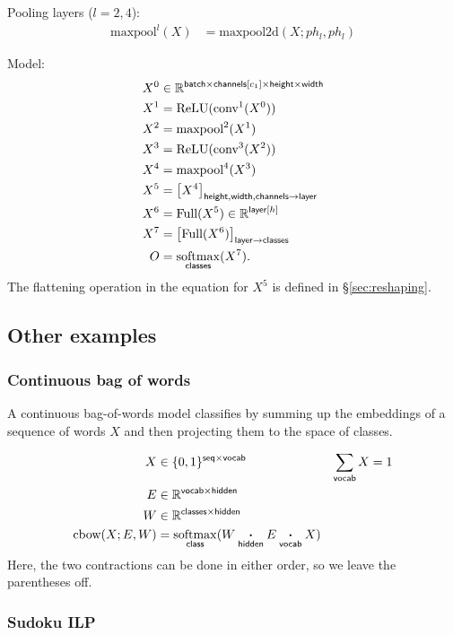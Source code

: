 \documentclass{article}
\newcommand{\reals}{\mathbb{R}}
\begin{document}
Pooling layers ($l = 2, 4$):
\begin{align*}
\text{maxpool}^l(X) &= \text{maxpool2d}(X; ph_l, ph_l)
\end{align*}

Model:
\begin{align*}
X^0 &\in \reals^{\name{batch} \times \nset{channels}{c_1} \times \name{height} \times \name{width}}\\
X^1 &= \text{ReLU}(\text{conv}^1(X^0)) \\
X^2 &= \text{maxpool}^2(X^1) \\
X^3 &= \text{ReLU}(\text{conv}^3(X^2)) \\
X^4 &= \text{maxpool}^4(X^3) \\
X^5 &= \nmov{height,width,channels}{layer}{X^4} \\
X^6 &= \text{Full}(X^5) \in \mathbb{R}^{\nset{layer}{h}} \\
X^7 &= \nmov{layer}{classes}{\text{Full}(X^6)} \\
O &= \nfun{classes}{softmax}(X^7).
\end{align*}
The flattening operation in the equation for $X^5$ is defined in \S{\ref{sec:reshaping}}.

\subsection{Other examples}

\subsubsection{Continuous bag of words}

A continuous bag-of-words model classifies by summing up the embeddings of a sequence of words $X$ and then projecting them to the space of classes. 

\begin{align*}
X &\in \{0, 1\}^{{\name{seq} \times \name{vocab}}} & \nsum{vocab} X &= 1\\
E &\in \reals^{{\name{vocab} \times \name{hidden}}}\\
W &\in \reals^{{\name{classes} \times \name{hidden}}}\\
\text{cbow}(X; E, W) &= \nfun{class}{softmax} (W \ndot{hidden} E \ndot{vocab} X)
\end{align*}
Here, the two contractions can be done in either order, so we leave the parentheses off.

\subsubsection{Sudoku ILP}
\end{document}
